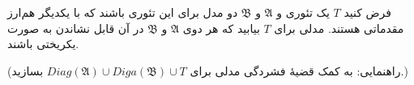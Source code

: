 فرض کنید $T$ یک تئوری و $\mathfrak{A}$ و $\mathfrak{B}$ دو مدل برای این تئوری باشند که با یکدیگر هم‌ارز مقدماتی هستند. مدلی برای $T$ بیابید که هر دوی $\mathfrak{A}$ و $\mathfrak{B}$ در آن قابل نشاندن به صورت یکریختی باشند.

(راهنمایی: به کمک قضیهٔ فشردگی مدلی برای $Diag(\mathfrak{A}) \cup Diga(\mathfrak{B}) \cup T$ بسازید.)